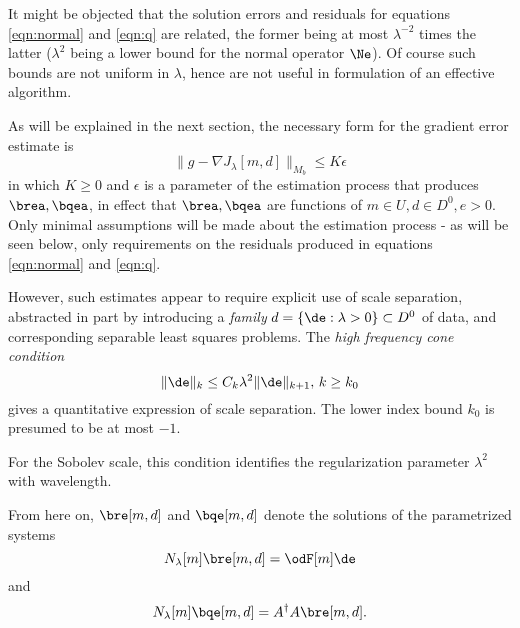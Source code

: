 It might be objected that the solution errors and residuals for
equations \ref{eqn:normal} and \ref{eqn:q} are related, the former
being at most $\lambda^{-2}$ times the latter ($\lambda^2$ being a
lower bound for the normal operator $\Ne$). Of course such bounds are
not uniform in $\lambda$, hence are not useful in formulation of an
effective algorithm.

As will be explained in the next section, the necessary form for the
gradient error estimate is
\begin{equation}
\label{eqn:graderr}
\|g - \nabla J_{\lambda}[m,d]\|_{M_b} \le K \epsilon
\end{equation}
in which $K \ge 0$ and $\epsilon$ is a parameter of the estimation process
that produces $\brea,\bqea$, in effect that $\brea,\bqea$
are functions of $m \in U, d\in D^0, e >0$. Only minimal assumptions
will be made about the estimation process - as will be seen below,
only requirements on the residuals produced in equations
\ref{eqn:normal} and \ref{eqn:q}. 

However, such estimates appear to
require explicit use of scale separation, abstracted in part by introducing a
{\em family} $d=\{\de: \lambda > 0\} \subset D^0$ of data, and
corresponding separable least squares problems. The {\em high
  frequency cone condition}
\begin{equation}
\label{eqn:hfc}
\|\de\|_k \le C_k\lambda^2 \|\de\|_{k+1},\, k \ge k_0
\end{equation}
gives a quantitative expression of scale separation. The lower index
bound $k_0$ is presumed to be at most $-1$.

\begin{rem} For the Sobolev scale, this condition identifies the
  regularization parameter $\lambda^2$ with wavelength.
\end{rem}

From
here on, $\bre[m,d]$ and $\bqe[m,d]$ denote the solutions of the
parametrized systems
\begin{equation}
\label{eqn:normalbis}
N_{\lambda}[m]\bre[m,d] = \odF[m]\de  
\end{equation} 
and
\begin{equation}
\label{eqn:qbis}
N_{\lambda}[m]\bqe[m,d] = A^{\dagger}A\bre[m,d]. 
\end{equation}

